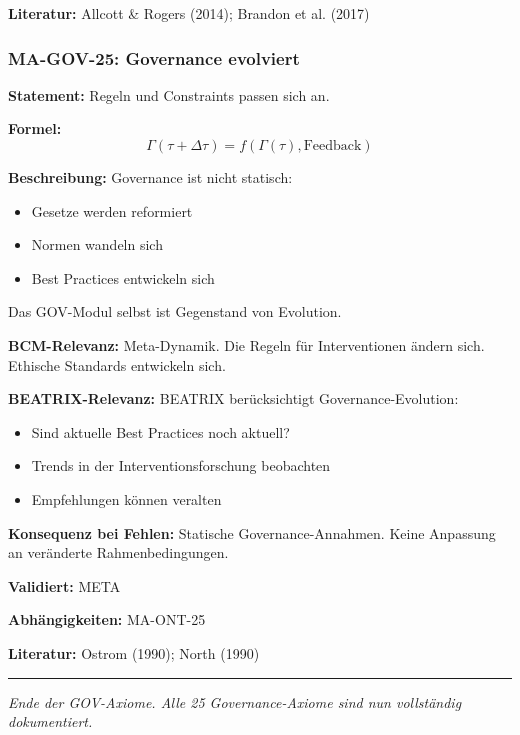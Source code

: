 \textbf{Literatur:} Allcott \& Rogers (2014); Brandon et al. (2017)


\subsubsection*{MA-GOV-25: Governance evolviert}

\textbf{Statement:} Regeln und Constraints passen sich an.

\textbf{Formel:}
\begin{equation}
\Gamma(\tau + \Delta\tau) = f(\Gamma(\tau), \text{Feedback})
\end{equation}

\textbf{Beschreibung:}
Governance ist nicht statisch:
\begin{itemize}
    \item Gesetze werden reformiert
    \item Normen wandeln sich
    \item Best Practices entwickeln sich
\end{itemize}
Das GOV-Modul selbst ist Gegenstand von Evolution.

\textbf{BCM-Relevanz:}
Meta-Dynamik. Die Regeln für Interventionen ändern sich. Ethische Standards entwickeln sich.

\textbf{BEATRIX-Relevanz:}
BEATRIX berücksichtigt Governance-Evolution:
\begin{itemize}
    \item Sind aktuelle Best Practices noch aktuell?
    \item Trends in der Interventionsforschung beobachten
    \item Empfehlungen können veralten
\end{itemize}

\textbf{Konsequenz bei Fehlen:}
Statische Governance-Annahmen. Keine Anpassung an veränderte Rahmenbedingungen.

\textbf{Validiert:} META

\textbf{Abhängigkeiten:} MA-ONT-25

\textbf{Literatur:} Ostrom (1990); North (1990)

\bigskip
\noindent\rule{\textwidth}{0.4pt}
\textit{Ende der GOV-Axiome. Alle 25 Governance-Axiome sind nun vollständig dokumentiert.}
